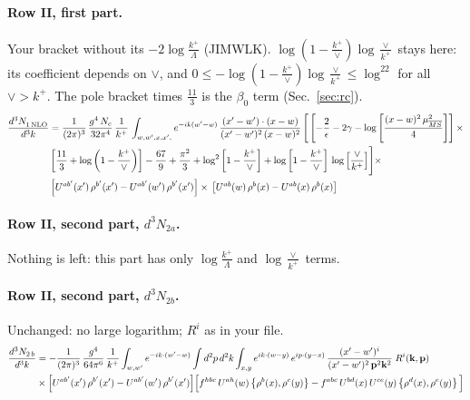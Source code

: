 \documentclass[10pt]{article}
\numberwithin{equation}{section}
\begin{document}
\paragraph{Row II, first part.}
Your bracket without its $-2\log\frac{k^+}{\Lambda}$ (JIMWLK). $\log(1-\frac{k^+}{\vee})\log\frac{\vee}{k^+}$ stays here: its coefficient depends on $\vee$, and $0\le-\log(1-\frac{k^+}{\vee})\log\frac{\vee}{k^+}\le\log^22$ for all $\vee>k^+$. The pole bracket times $\frac{11}{3}$ is the $\beta_0$ term (Sec.~\ref{sec:rc}).
\begin{align}
     \frac{d^{3}N_{1\,\rm NLO}^{\rm}}{d^{3}k} &  =  \frac{1}{(2\pi)^{3}}\, \frac{g^{4}\,N_{c}}{32\pi^{4}}\,\frac{1}{k^{+}}\, \int_{w, w',x,x',} e^{-ik(w^\prime-w)}\, \frac{(x'-w')\cdot (x-w)}{(x'-w')^{2}\, (x-w)^{2}}\, \Bigg[\left[-\frac{2}{\epsilon}-2\gamma-\log{\left[\frac{(x-w)^{2}\,\mu^{2}_{\overline{MS}}}{4}\right]}\right]\times \notag \\ & \left[\frac{11}{3}+\log{\left(1-\frac{k^{+}}{\vee}\right)}\right]-\frac{67}{9}+\frac{\pi^{2}}{3}+\log^{2}{\left[1-\frac{k^{+}}{\vee}\right]}+\log{\left[1-\frac{k^{+}}{\vee}\right]}\,\log{\left[\frac{\vee}{k^{+}}\right]}\Bigg]\times\notag \\ & \left[U^{ab'}(x')\,\rho^{b'}(x') - U^{ab'}(w')\,\rho^{b'}(x')\right]\times\,\left[U^{ab}(w)\,\rho^{b}(x) - U^{ab}(x)\,\rho^{b}(x)\right] \label{eq:F:G1II1}
\end{align}

\paragraph{Row II, second part, $d^3N_{2a}$.}
Nothing is left: this part has only $\log\frac{k^+}{\Lambda}$ and $\log\frac{\vee}{k^+}$ terms.
\paragraph{Row II, second part, $d^3N_{2b}$.}
Unchanged: no large logarithm; $R^i$ as in your file.
\begin{align}
\frac{d^{3}N_{2\,b}}{d^{3}k} & =  -\frac{1}{(2\pi)^{3}}\,\frac{g^{4}}{64\pi^{6}}\,\frac{1}{k^{+}}\int_{w,w'} e^{-ik\cdot(w'-w)}
\int d^{2}p\,d^{2}k\int_{x,y} e^{ik\cdot(w-y)}\,e^{ip\cdot(y-x)}\,\frac{(x'-w')^{i}}{(x'-w')^{2}\,\mathbf{p}^{2}\mathbf{k}^{2}}\;R^{i}(\mathbf{k},\mathbf{p})\notag\\
&\times\Big[U^{ab'}(x')\,\rho^{b'}(x')-U^{ab'}(w')\,\rho^{b'}(x')\Big]
\Big[f^{hbc}\,U^{ah}(w)\left\{\rho^{b}(x),\rho^{c}(y)\right\}-f^{abc}\,U^{bd}(x)\,U^{ce}(y)\left\{\rho^{d}(x),\rho^{e}(y)\right\}\Big] \label{eq:F:G1II2b}
\end{align}
\end{document}
